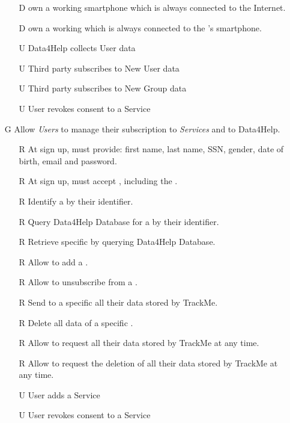 \documentclass[../../../rasd.tex]{subfiles}
\begin{document}
\begin{itemize}
\begin{itemize}
		\item[D\subs{10}] own a working smartphone which is always connected to the Internet.
		\item[D\subs{11}] own a working  which is always connected to the 's smartphone.
		\\
		\item[U\subs{5}]Data4Help collects User data
		\item[U\subs{8}]Third party subscribes to New User data
		\item[U\subs{9}]Third party subscribes to New Group data
		\item[U\subs{11}]User revokes consent to a Service
	\end{itemize}

	\item[G\subs{5}]Allow \textit{Users} to manage their subscription to \textit{Services} and to Data4Help.
	\begin{itemize}
		\item[R\subs{2}]At sign up,  must provide: first name, last name, SSN, gender, date of birth, email and password.
		\item[R\subs{4}]At sign up,  must accept , including the .
		\item[R\subs{6}]Identify a  by their identifier.
		\item[R\subs{7}]Query Data4Help Database for a  by their identifier.
		\item[R\subs{12}]Retrieve specific  by querying Data4Help Database.
		\item[R\subs{30}]Allow  to add a .
		\item[R\subs{31}]Allow  to unsubscribe from a .
		\item[R\subs{32}]Send to a specific  all their data stored by TrackMe.
		\item[R\subs{33}]Delete all data of a specific .
		\item[R\subs{34}]Allow  to request all their data stored by TrackMe at any time.
		\item[R\subs{35}]Allow  to request the deletion of all their data stored by TrackMe at any time.
		\\
		\item[U\subs{10}]User adds a Service
		\item[U\subs{11}]User revokes consent to a Service
	\end{itemize}
\end{itemize}
\end{document}
